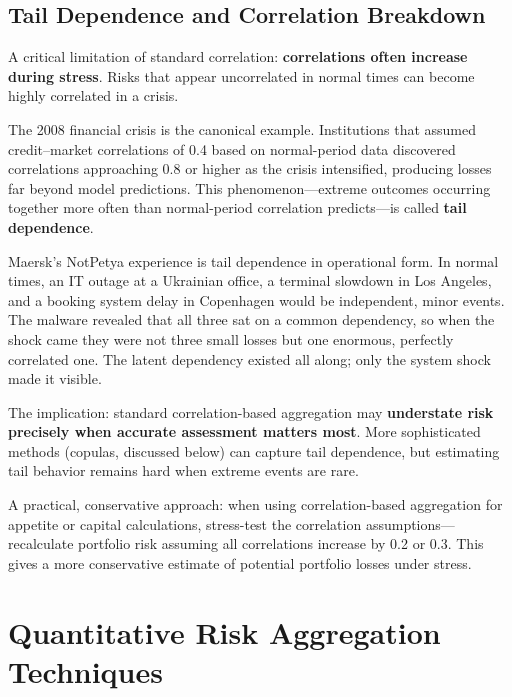 \documentclass[11pt,openany]{book}
\begin{document}
\subsection{Tail Dependence and Correlation Breakdown}
\label{subsec:tail-dependence}

A critical limitation of standard correlation: \textbf{correlations often
increase during stress}. Risks that appear uncorrelated in normal times can
become highly correlated in a crisis.

The 2008 financial crisis is the canonical example. Institutions that assumed
credit--market correlations of 0.4 based on normal-period data discovered
correlations approaching 0.8 or higher as the crisis intensified, producing
losses far beyond model predictions. This phenomenon---extreme outcomes
occurring together more often than normal-period correlation predicts---is
called \textbf{tail dependence}.

Maersk's NotPetya experience is tail dependence in operational form. In normal
times, an IT outage at a Ukrainian office, a terminal slowdown in Los Angeles,
and a booking system delay in Copenhagen would be independent, minor events.
The malware revealed that all three sat on a common dependency, so when the
shock came they were not three small losses but one enormous, perfectly
correlated one. The latent dependency existed all along; only the system shock
made it visible.

The implication: standard correlation-based aggregation may \textbf{understate
risk precisely when accurate assessment matters most}. More sophisticated
methods (copulas, discussed below) can capture tail dependence, but estimating
tail behavior remains hard when extreme events are rare.

A practical, conservative approach: when using correlation-based aggregation
for appetite or capital calculations, stress-test the correlation
assumptions---recalculate portfolio risk assuming all correlations increase by
0.2 or 0.3. This gives a more conservative estimate of potential portfolio
losses under stress.

\section{Quantitative Risk Aggregation Techniques}
\label{sec:aggregation-techniques}
\end{document}
